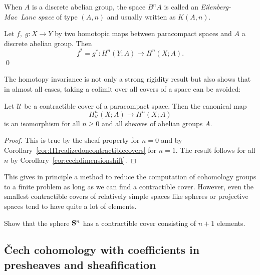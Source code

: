\documentclass[a4paper,openany]{scrbook}
\begin{document}
\begin{defn}
When $A$ is a discrete abelian group, the space $B^nA$ is called an \emph{Eilenberg-Mac~Lane space} of type $(A,n)$ and usually written as $K(A,n)$.
\end{defn}

\begin{corollary}\label{cor:cechcohomologyhomotopyinvariance}
Let $f,\;g\colon X \to Y$ by two homotopic maps between paracompact spaces and $A$ a discrete abelian group. Then
\[
f^*=g^*\colon H^n(Y;A) \to H^n(X;A).
\] \qed 
\end{corollary}


The homotopy invariance is not only a strong rigidity result but also shows that in almost all cases, taking a colimit over all covers of a space can be avoided:

\begin{thm}\label{thm:contractible-covers}
Let $\mathcal U$ be a contractible cover of a paracompact space. Then the canonical map
\[
H^n_{\mathcal U}(X;A) \to H^n(X;A) 
\]
is an isomorphism for all $n \geq 0$ and all sheaves of abelian groups $A$.
\end{thm}
\begin{proof}
This is true by the sheaf property for $n=0$ and by Corollary~\ref{cor:H1realizedoncontractiblecovers} for $n=1$. The result follows for all $n$ by Corollary~\ref{cor:cechdimensionshift}. 
\end{proof}

This gives in principle a method to reduce the computation of cohomology groups to a finite problem as long as we can find a contractible cover. However, even the smallest contractible covers of relatively simple spaces like spheres or projective spaces tend to have quite a lot of elements.

\begin{exer}
Show that the sphere $\S^n$ has a contractible cover consisting of $n+1$ elements.
\end{exer}

\subsection{\v Cech cohomology with coefficients in presheaves and sheafification}
\end{document}
